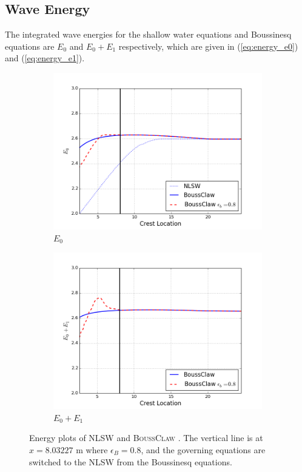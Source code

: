 \documentclass[review]{elsarticle}
\newcommand{\BoussClaw}{\textsc{BoussClaw} }
\begin{document}
\subsection{Wave Energy}

The integrated wave energies  
for the shallow water equations and Boussinesq equations
are $E_0$ and $E_0+E_1$  respectively, 
which are given in (\ref{eq:energy_e0}) and (\ref{eq:energy_e1}). 

\begin{figure}[tbh!]
    \centering
    \begin{subfigure}[b]{0.45\textwidth}
        \includegraphics[width=\textwidth]{_fig/e0_boussclaw_eb08.png}
        \caption{$E_0$}
        \label{fig:e0_boussclaw_eb08}
    \end{subfigure}
    \begin{subfigure}[b]{0.45\textwidth}
        \includegraphics[width=\textwidth]{_fig/e1_boussclaw_eb08.png}
        \caption{$E_0+E_1$}
        \label{fig:e1_boussclaw_eb08}
    \end{subfigure}
    \caption{Energy plots of NLSW and \BoussClaw.
    The vertical line is at $x=8.03227$ m where $\epsilon_B=0.8$,
    and the governing equations are switched to the NLSW from
    the Boussinesq equations. }
    \label{fig:energy_boussclaw_swe}
\end{figure}
\end{document}
